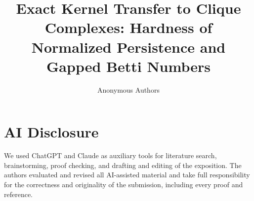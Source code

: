 \documentclass[a4paper,UKenglish,cleveref,numberwithinsect,anonymous]{lipics-v2021}
\title{Exact Kernel Transfer to Clique Complexes: Hardness of Normalized
Persistence and Gapped Betti Numbers}
\author{Anonymous Authors}{Anonymous affiliation}{}{}{}
\begin{document}
\raggedbottom
\maketitle

\begin{abstract}

\end{abstract}











\clearpage



\clearpage
\appendix




\section*{AI Disclosure}
We used ChatGPT and Claude as auxiliary tools for literature search,
brainstorming, proof checking, and drafting and editing of the exposition.
The authors evaluated and revised all AI-assisted material and take full
responsibility for the correctness and originality of the submission,
including every proof and reference.
\end{document}
